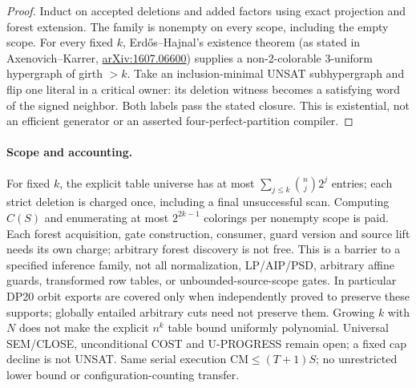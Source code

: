 \documentclass[11pt]{article}
\begin{document}
\begin{proof}
Induct on accepted deletions and added factors using exact projection and forest extension. The family is nonempty on every scope, including the empty scope. For every fixed $k$, Erd\H{o}s--Hajnal's existence theorem (as stated in Axenovich--Karrer, \href{https://arxiv.org/abs/1607.06600}{arXiv:1607.06600}) supplies a non-2-colorable 3-uniform hypergraph of girth $>k$. Take an inclusion-minimal UNSAT subhypergraph and flip one literal in a critical owner: its deletion witness becomes a satisfying word of the signed neighbor. Both labels pass the stated closure. This is existential, not an efficient generator or an asserted four-perfect-partition compiler.
\end{proof}
\paragraph{Scope and accounting.}
For fixed $k$, the explicit table universe has at most $\sum_{j\le k}\binom nj2^j$ entries; each strict deletion is charged once, including a final unsuccessful scan. Computing $C(S)$ and enumerating at most $2^{2k-1}$ colorings per nonempty scope is paid. Each forest acquisition, gate construction, consumer, guard version and source lift needs its own charge; arbitrary forest discovery is not free. This is a barrier to a specified inference family, not all normalization, LP/AIP/PSD, arbitrary affine guards, transformed row tables, or unbounded-source-scope gates. In particular DP20 orbit exports are covered only when independently proved to preserve these supports; globally entailed arbitrary cuts need not preserve them. Growing $k$ with $N$ does not make the explicit $n^k$ table bound uniformly polynomial. Universal SEM/CLOSE, unconditional COST and U-PROGRESS remain open; a fixed cap decline is not UNSAT. Same serial execution $\mathrm{CM}\le(T+1)S$; no unrestricted lower bound or configuration-counting transfer.
\end{document}
